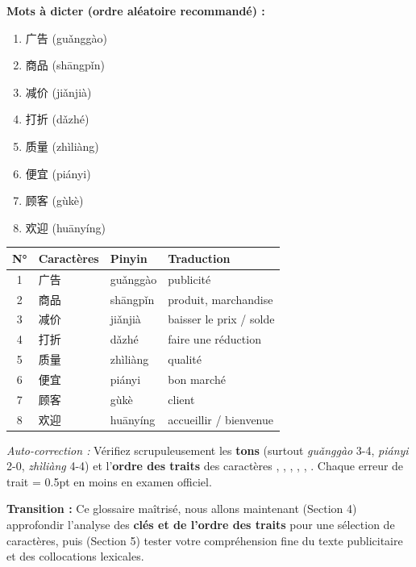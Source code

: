 \documentclass[11pt]{article}
\newcommand{\zh}[1]{\ifmmode\text{#1}\else{#1}\fi}
\begin{document}
\begin{exercice}
\textbf{Mots à dicter (ordre aléatoire recommandé) :}
\begin{enumerate}
    \item 广告 (guǎnggào)
    \item 商品 (shāngpǐn)
    \item 减价 (jiǎnjià)
    \item 打折 (dǎzhé)
    \item 质量 (zhìliàng)
    \item 便宜 (piányi)
    \item 顾客 (gùkè)
    \item 欢迎 (huānyíng)
\end{enumerate}
\end{exercice}

\begin{corrige}
\begin{center}
\begin{tabularx}{\linewidth}{|c|X|X|X|}
\hline
\rowcolor{popblueL} \textbf{N°} & \textbf{Caractères} & \textbf{Pinyin} & \textbf{Traduction} \\ \hline
1 & 广告 & guǎnggào & publicité \\ \hline
2 & 商品 & shāngpǐn & produit, marchandise \\ \hline
3 & 减价 & jiǎnjià & baisser le prix / solde \\ \hline
4 & 打折 & dǎzhé & faire une réduction \\ \hline
5 & 质量 & zhìliàng & qualité \\ \hline
6 & 便宜 & piányi & bon marché \\ \hline
7 & 顾客 & gùkè & client \\ \hline
8 & 欢迎 & huānyíng & accueillir / bienvenue \\ \hline
\end{tabularx}
\end{center}

\emph{Auto-correction :} Vérifiez scrupuleusement les \textbf{tons} (surtout \emph{guǎnggào} 3-4, \emph{piányi} 2-0, \emph{zhìliàng} 4-4) et l'\textbf{ordre des traits} des caractères \zh{商}, \zh{质}, \zh{价}, \zh{顾}, \zh{饮}, \zh{折}. Chaque erreur de trait = 0.5pt en moins en examen officiel.
\end{corrige}

\textbf{Transition :} Ce glossaire maîtrisé, nous allons maintenant (Section 4) approfondir l'analyse des \textbf{clés et de l'ordre des traits} pour une sélection de caractères, puis (Section 5) tester votre compréhension fine du texte publicitaire et des collocations lexicales.
\end{document}
